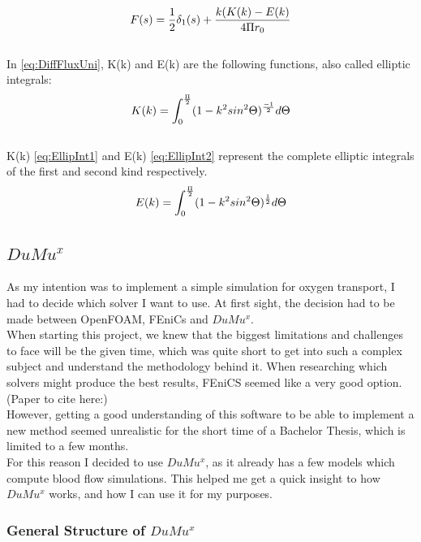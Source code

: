 %
\begin{equation}
\\F(s) = \frac{1}{2} \delta_1 (s) + \frac{k (K(k) - E(k)}{4 \Pi r_0}
\label{eq:DiffFluxUni}
\end{equation}
\\In \ref{eq:DiffFluxUni}, K(k) and E(k) are the following functions, also called elliptic integrals:
%
\begin{equation}
\\K(k) = \int_{0}^{\frac{\Pi}{2}} (1 - k^2 sin^2 \Theta)^ \frac{-1}{2} d \Theta
\label{eq:EllipInt1}
\end{equation}
\\K(k) \ref{eq:EllipInt1} and E(k) \ref{eq:EllipInt2} represent the complete elliptic integrals of the first and second kind respectively.
%
\begin{equation}
\\E(k) = \int_{0}^{\frac{\Pi}{2}} (1 - k^2 sin^2 \Theta)^ \frac{1}{2} d \Theta
\label{eq:EllipInt2}
\end{equation}

\newpage
\subsection{$DuMu^x$}

As my intention was to implement a simple simulation for oxygen transport, I had to decide which solver I want to use. At first sight, the decision had to be made between OpenFOAM, FEniCs and $DuMu^x$. 
\\When starting this project, we knew that the biggest limitations and challenges to face will be the given time, which was quite short to get into such a complex subject and understand the methodology behind it. When researching which solvers might produce the best results, FEniCS seemed like a very good option.
\\(Paper to cite here:\cite{holter2018sub})
\\However, getting a good understanding of this software to be able to implement a new method seemed unrealistic for the short time of a Bachelor Thesis, which is limited to a few months.
\\For this reason I decided to use $DuMu^x$, as it already has a few models which compute blood flow simulations. This helped me get a quick insight to how $DuMu^x$ works, and how I can use it for my purposes.

\subsubsection{General Structure of $DuMu^x$}

